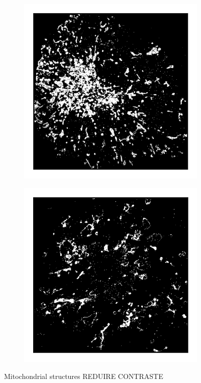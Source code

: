 \begin{figure}
\begin{subfigure}{0.32\textwidth}
        \caption{}
    \end{subfigure}
    \begin{subfigure}{0.32\textwidth}
        \includegraphics[width=\textwidth]{figures/mitochondria_image12.png}
        \caption{}
    \end{subfigure}
    \begin{subfigure}{0.32\textwidth}
        \includegraphics[width=\textwidth]{figures/mitochondria_image10.png}
        \caption{}
    \end{subfigure}
    \caption{Mitochondrial structures REDUIRE CONTRASTE}
\end{figure}